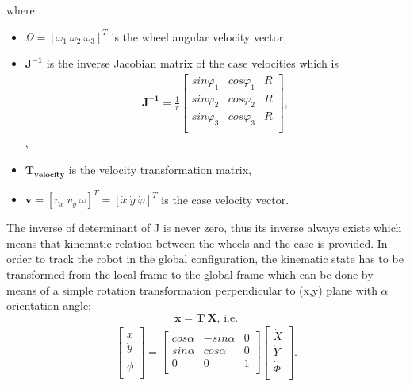 \documentclass[12pt,english,twoside]{article}
\begin{document}
where
\begin{itemize}
	\item $\Omega = [\omega_1~\omega_2~\omega_3]^T$ is the wheel angular velocity vector,
	\item $\mathbf{J^{-1}}$ is the inverse Jacobian matrix of the case velocities which is
		\begin{eqnarray}
		\mathbf{J^{-1}}=\frac{1}{r} \left[
		\begin{array}{ccc}
		sin \varphi_1 & cos \varphi_1 & R \\
		sin \varphi_2 & cos \varphi_2 & R \\
		sin \varphi_3 & cos \varphi_3 & R \\
		\end{array}
		\right],
		\end{eqnarray},
	\item $\mathbf{T_{velocity}}$ is the velocity transformation matrix,
	\item $\mathbf{v} = [v_x~v_y~\omega]^T = [\dot x~\dot y~\dot \varphi]^T$ is the case velocity vector.
\end{itemize}
The inverse of determinant of J is never zero, thus its inverse always exists which means that kinematic relation between the wheels and the case is provided. In order to track the robot in the global configuration, the kinematic state has to be transformed from the local frame to the global frame which can be done by means of a simple rotation transformation perpendicular to (x,y) plane with $\alpha$ orientation angle:
\begin{equation}
\boldsymbol{x} = \mathbf{T}~\mathbf{X}\text{, i.e.}
\end{equation}
\begin{eqnarray}
\left[
\begin{array}{c}
\dot x \\
\dot y 	\\
\dot \phi \\
\end{array}
\right]=
\left[
\begin{array}{ccc}
cos \alpha 	& -sin \alpha & 0 \\
sin \alpha 	& cos \alpha & 0 \\
0	 		& 0 		 & 1 \\
\end{array}
\right]
\left[
\begin{array}{c}
\dot X \\
\dot Y 	\\
\dot \Phi \\
\end{array}
\right].
\end{eqnarray}
\end{document}
